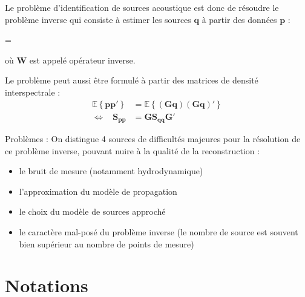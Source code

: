 \documentclass[twocolumn, 11pt]{article}
\renewenvironment{equation}{\vspace{-0.2cm}\begin{oldequation}}{\vspace{-0.2cm}\end{oldequation}}
\begin{document}
Le problème d'identification de sources acoustique est donc de résoudre le problème inverse qui consiste à estimer les sources $\bm{q}$ à partir des données  $\bm{p}$ :
\begin{equation}
=
\end{equation}
où $\bm{W}$ est appelé opérateur inverse.

Le problème peut aussi être formulé à partir des matrices de densité interspectrale  : 
\begin{align}
		 \mathbb{E} \left\{ \bm{p p}' \right\} &= \mathbb{E} \left\{ (\bm{Gq})(\bm{Gq})' \right\}\\
	\Leftrightarrow~~~~  \bm{S_{pp}} &= \bm{G S_{qq}G}'
\end{align} 




Problèmes : On distingue 4 sources de difficultés majeures pour la résolution de ce problème inverse, pouvant nuire à la qualité de la reconstruction : \\
\begin{itemize}
	\item le bruit de mesure (notamment hydrodynamique)
	\item l'approximation du modèle de propagation
	\item le choix du modèle de sources approché
	\item le caractère mal-posé du problème inverse (le nombre de source est souvent bien supérieur au nombre de points de mesure)
\end{itemize}


\newpage
\section*{Notations}
\end{document}
